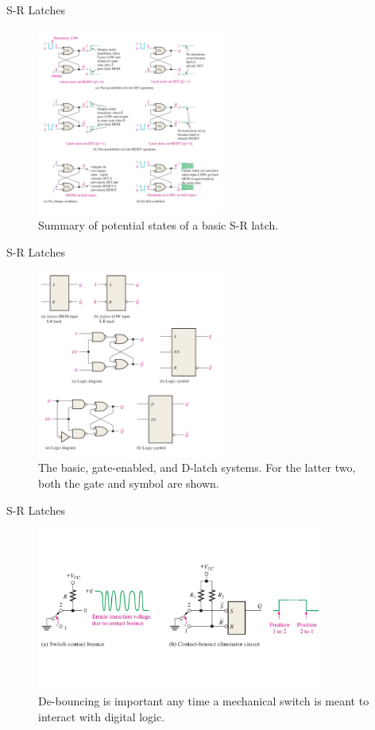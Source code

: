 \documentclass{beamer}
\begin{document}
\begin{frame}{S-R Latches}
\begin{figure}
\centering
\includegraphics[width=0.55\textwidth]{figures/SR2.pdf}
\caption{\label{fig:sr2} Summary of potential states of a basic S-R latch.}
\end{figure}
\end{frame}

\begin{frame}{S-R Latches}
\begin{figure}
\centering
\includegraphics[width=0.55\textwidth]{figures/SR3.pdf}
\caption{\label{fig:sr3} The basic, gate-enabled, and D-latch systems.  For the latter two, both the gate and symbol are shown.}
\end{figure}
\end{frame}

\begin{frame}{S-R Latches}
\begin{figure}
\centering
\includegraphics[width=0.85\textwidth]{figures/SR4.pdf}
\caption{\label{fig:sr4} De-bouncing is important any time a mechanical switch is meant to interact with digital logic.}
\end{figure}
\end{frame}
\end{document}
